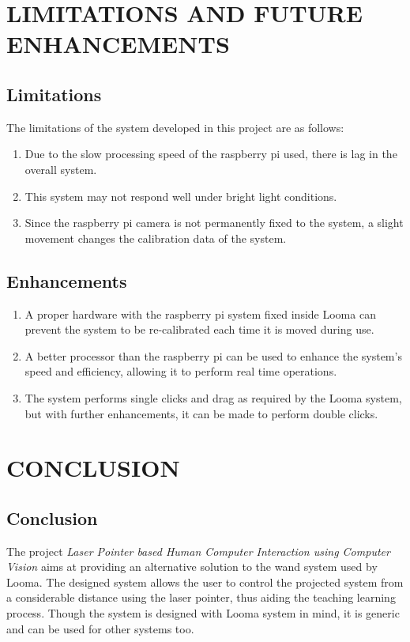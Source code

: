 \documentclass[12pt, a4paper]{article}
\begin{document}
\section{LIMITATIONS AND FUTURE ENHANCEMENTS}
\subsection{Limitations}

The limitations of the system developed in this project are as follows:

\begin{enumerate}
\item Due to the slow processing speed of the raspberry pi used, there is lag in the overall system. 
\item This system may not respond well under bright light conditions.
\item Since the raspberry pi camera is not permanently fixed to the system, a slight movement changes the calibration data of the system.

\end{enumerate}

\subsection{Enhancements}

\begin{enumerate}
\item A proper hardware with the raspberry pi system fixed inside Looma can prevent the system to be re-calibrated each time it is moved during use.
\item A better processor than the raspberry pi can be used to enhance the system’s speed and efficiency, allowing it to perform real time operations.
\item The system performs single clicks and drag as required by the Looma system, but with further enhancements, it can be made to perform double clicks.
\end{enumerate}
\newpage
\section{CONCLUSION}
\subsection{Conclusion}
The project \emph{Laser Pointer based Human Computer Interaction using Computer Vision} aims at providing an alternative solution to the wand system used by Looma. The designed system allows the user to control the projected system from a considerable distance using the laser pointer, thus aiding the teaching learning process. Though the system is designed with Looma system in mind, it is generic and can be used for other systems too.
\end{document}
